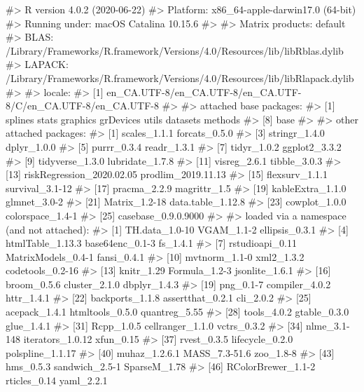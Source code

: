 \documentclass[
]{jss}
\begin{document}
\begin{CodeChunk}

\begin{CodeOutput}
#> R version 4.0.2 (2020-06-22)
#> Platform: x86_64-apple-darwin17.0 (64-bit)
#> Running under: macOS Catalina 10.15.6
#> 
#> Matrix products: default
#> BLAS:   /Library/Frameworks/R.framework/Versions/4.0/Resources/lib/libRblas.dylib
#> LAPACK: /Library/Frameworks/R.framework/Versions/4.0/Resources/lib/libRlapack.dylib
#> 
#> locale:
#> [1] en_CA.UTF-8/en_CA.UTF-8/en_CA.UTF-8/C/en_CA.UTF-8/en_CA.UTF-8
#> 
#> attached base packages:
#> [1] splines   stats     graphics  grDevices utils     datasets  methods  
#> [8] base     
#> 
#> other attached packages:
#>  [1] scales_1.1.1              forcats_0.5.0            
#>  [3] stringr_1.4.0             dplyr_1.0.0              
#>  [5] purrr_0.3.4               readr_1.3.1              
#>  [7] tidyr_1.0.2               ggplot2_3.3.2            
#>  [9] tidyverse_1.3.0           lubridate_1.7.8          
#> [11] visreg_2.6.1              tibble_3.0.3             
#> [13] riskRegression_2020.02.05 prodlim_2019.11.13       
#> [15] flexsurv_1.1.1            survival_3.1-12          
#> [17] pracma_2.2.9              magrittr_1.5             
#> [19] kableExtra_1.1.0          glmnet_3.0-2             
#> [21] Matrix_1.2-18             data.table_1.12.8        
#> [23] cowplot_1.0.0             colorspace_1.4-1         
#> [25] casebase_0.9.0.9000      
#> 
#> loaded via a namespace (and not attached):
#>  [1] TH.data_1.0-10      VGAM_1.1-2          ellipsis_0.3.1     
#>  [4] htmlTable_1.13.3    base64enc_0.1-3     fs_1.4.1           
#>  [7] rstudioapi_0.11     MatrixModels_0.4-1  fansi_0.4.1        
#> [10] mvtnorm_1.1-0       xml2_1.3.2          codetools_0.2-16   
#> [13] knitr_1.29          Formula_1.2-3       jsonlite_1.6.1     
#> [16] broom_0.5.6         cluster_2.1.0       dbplyr_1.4.3       
#> [19] png_0.1-7           compiler_4.0.2      httr_1.4.1         
#> [22] backports_1.1.8     assertthat_0.2.1    cli_2.0.2          
#> [25] acepack_1.4.1       htmltools_0.5.0     quantreg_5.55      
#> [28] tools_4.0.2         gtable_0.3.0        glue_1.4.1         
#> [31] Rcpp_1.0.5          cellranger_1.1.0    vctrs_0.3.2        
#> [34] nlme_3.1-148        iterators_1.0.12    xfun_0.15          
#> [37] rvest_0.3.5         lifecycle_0.2.0     polspline_1.1.17   
#> [40] muhaz_1.2.6.1       MASS_7.3-51.6       zoo_1.8-8          
#> [43] hms_0.5.3           sandwich_2.5-1      SparseM_1.78       
#> [46] RColorBrewer_1.1-2  rticles_0.14        yaml_2.2.1         

\end{CodeOutput}
\end{CodeChunk}
\end{document}

